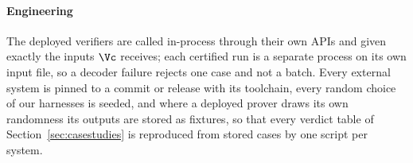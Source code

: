 \paragraph{Engineering}
The deployed verifiers are called in-process through their own APIs and
given exactly the inputs $\Vc$ receives; each certified run is a separate
process on its own input file, so a decoder failure rejects one case and
not a batch. Every external system is pinned to a commit or release with
its toolchain, every random choice of our harnesses is seeded, and where a
deployed prover draws its own randomness its outputs are stored as
fixtures, so that every verdict table of Section~\ref{sec:casestudies} is
reproduced from stored cases by one script per system. 
